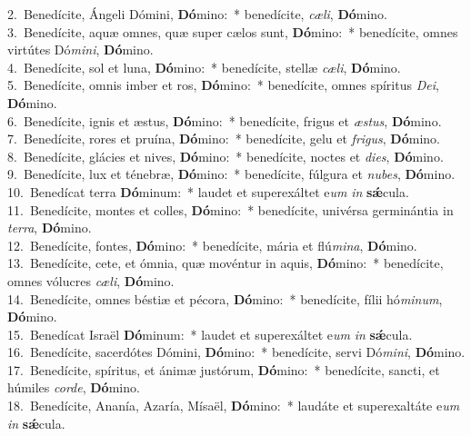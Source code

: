 {2.~}Benedícite, Ángeli Dómini, \textbf{Dó}mino:~* benedícite, \textit{cæ}\textit{li}, \textbf{Dó}mino.\\
{3.~}Benedícite, aquæ omnes, quæ super cælos sunt, \textbf{Dó}mino:~* benedícite, omnes virtútes Dó\textit{mi}\textit{ni}, \textbf{Dó}mino.\\
{4.~}Benedícite, sol et luna, \textbf{Dó}mino:~* benedícite, stellæ \textit{cæ}\textit{li}, \textbf{Dó}mino.\\
{5.~}Benedícite, omnis imber et ros, \textbf{Dó}mino:~* benedícite, omnes spíritus \textit{De}\textit{i}, \textbf{Dó}mino.\\
{6.~}Benedícite, ignis et æstus, \textbf{Dó}mino:~* benedícite, frigus et \textit{æ}\textit{stus}, \textbf{Dó}mino.\\
{7.~}Benedícite, rores et pruína, \textbf{Dó}mino:~* benedícite, gelu et \textit{fri}\textit{gus}, \textbf{Dó}mino.\\
{8.~}Benedícite, glácies et nives, \textbf{Dó}mino:~* benedícite, noctes et \textit{di}\textit{es}, \textbf{Dó}mino.\\
{9.~}Benedícite, lux et ténebræ, \textbf{Dó}mino:~* benedícite, fúlgura et \textit{nu}\textit{bes}, \textbf{Dó}mino.\\
{10.~}Benedícat terra \textbf{Dó}minum:~* laudet et superexáltet e\textit{um} \textit{in} \textbf{sǽ}cula.\\
{11.~}Benedícite, montes et colles, \textbf{Dó}mino:~* benedícite, univérsa germinántia in \textit{ter}\textit{ra}, \textbf{Dó}mino.\\
{12.~}Benedícite, fontes, \textbf{Dó}mino:~* benedícite, mária et flú\textit{mi}\textit{na}, \textbf{Dó}mino.\\
{13.~}Benedícite, cete, et ómnia, quæ movéntur in aquis, \textbf{Dó}mino:~* benedícite, omnes vólucres \textit{cæ}\textit{li}, \textbf{Dó}mino.\\
{14.~}Benedícite, omnes béstiæ et pécora, \textbf{Dó}mino:~* benedícite, fílii hó\textit{mi}\textit{num}, \textbf{Dó}mino.\\
{15.~}Benedícat Israël \textbf{Dó}minum:~* laudet et superexáltet e\textit{um} \textit{in} \textbf{sǽ}cula.\\
{16.~}Benedícite, sacerdótes Dómini, \textbf{Dó}mino:~* benedícite, servi Dó\textit{mi}\textit{ni}, \textbf{Dó}mino.\\
{17.~}Benedícite, spíritus, et ánimæ justórum, \textbf{Dó}mino:~* benedícite, sancti, et húmiles \textit{cor}\textit{de}, \textbf{Dó}mino.\\
{18.~}Benedícite, Ananía, Azaría, Mísaël, \textbf{Dó}mino:~* laudáte et superexaltáte e\textit{um} \textit{in} \textbf{sǽ}cula.\\
